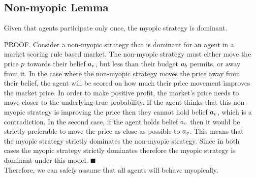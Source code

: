 \subsection{Non-myopic Lemma}
\begin{lemma}
Given that agents participate only once, the myopic strategy is dominant. 
\end{lemma}
PROOF. Consider a non-myopic strategy that is dominant for an agent in a market scoring rule based market. The non-myopic strategy must either move the price $p$ towards their belief $a_v$, but less than their budget $a_b$ permits, or away from it. In the case where the non-myopic strategy moves the price away from their belief, the agent will be scored on how much their price movement improves the market price. In order to make positive profit, the market's price needs to move closer to the underlying true probability. If the agent thinks that this non-myopic strategy is improving the price then they cannot hold belief $a_v$, which is a contradiction. In the second case, if the agent holds belief $a_v$ then it would be strictly preferable to move the price as close as possible to $a_v$. This means that the myopic strategy strictly dominates the non-myopic strategy. Since in both cases the myopic strategy strictly dominates therefore the myopic strategy is dominant under this model. $\blacksquare$\\

Therefore, we can safely assume that all agents will behave myopically.\\


